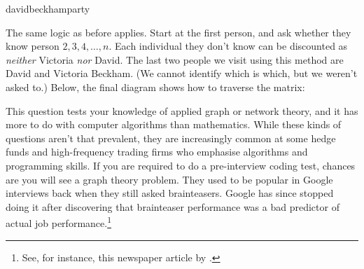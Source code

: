 \begin{answer}{davidbeckhamparty}
\begin{center}
\begin{tikzpicture}[scale=0.6]
\end{tikzpicture}
\end{center}
The same logic as before applies.
Start at the first person, and ask whether they know person $2, 3, 4, \ldots, n$.
Each individual they don't know can be discounted as \emph{neither} Victoria \emph{nor} David.
The last two people we visit using this method are David and Victoria Beckham.
(We cannot identify which is which, but we weren't asked to.)
Below, the final diagram shows how to traverse the matrix:
\begin{center}
\end{center}
This question tests your knowledge of applied graph or network theory, and it has more to do with computer algorithms than mathematics.
While these kinds of questions aren't that prevalent, they are increasingly common at some hedge funds and high-frequency trading firms who emphasise algorithms and programming skills.
If you are required to do a pre-interview coding test, chances are you will see a graph theory problem.
They used to be popular in Google interviews back when they still asked brainteasers.
Google has since stopped doing it after discovering that brainteaser performance was a bad predictor of actual job performance.\footnote{See, for instance, this newspaper article by \citet{GoogleBrainteasers}.}

\end{answer}
